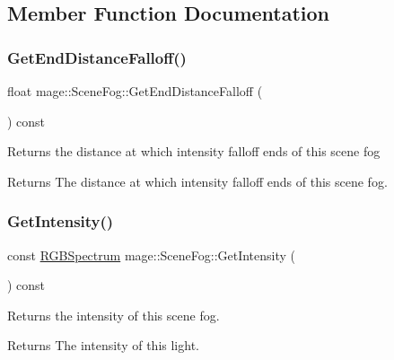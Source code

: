 \subsection{Member Function Documentation}
\hypertarget{structmage_1_1_scene_fog_a9f2d7ed1c03054ca305b500059c8c1f1}{}\label{structmage_1_1_scene_fog_a9f2d7ed1c03054ca305b500059c8c1f1} 
\subsubsection{\texorpdfstring{Get\+End\+Distance\+Falloff()}{GetEndDistanceFalloff()}}
{\footnotesize\ttfamily float mage\+::\+Scene\+Fog\+::\+Get\+End\+Distance\+Falloff (\begin{DoxyParamCaption}{ }\end{DoxyParamCaption}) const\hspace{0.3cm}{\ttfamily [noexcept]}}

Returns the distance at which intensity falloff ends of this scene fog

\begin{DoxyReturn}{Returns}
The distance at which intensity falloff ends of this scene fog. 
\end{DoxyReturn}
\hypertarget{structmage_1_1_scene_fog_ac383f82bf8e286ec3478a83fa857f04e}{}\label{structmage_1_1_scene_fog_ac383f82bf8e286ec3478a83fa857f04e} 
\subsubsection{\texorpdfstring{Get\+Intensity()}{GetIntensity()}}
{\footnotesize\ttfamily const \hyperlink{structmage_1_1_r_g_b_spectrum}{R\+G\+B\+Spectrum} mage\+::\+Scene\+Fog\+::\+Get\+Intensity (\begin{DoxyParamCaption}{ }\end{DoxyParamCaption}) const\hspace{0.3cm}{\ttfamily [noexcept]}}

Returns the intensity of this scene fog.

\begin{DoxyReturn}{Returns}
The intensity of this light. 
\end{DoxyReturn}
\hypertarget{structmage_1_1_scene_fog_a172532694595ff1919a4d062d9ffaccb}{}\label{structmage_1_1_scene_fog_a172532694595ff1919a4d062d9ffaccb} 
